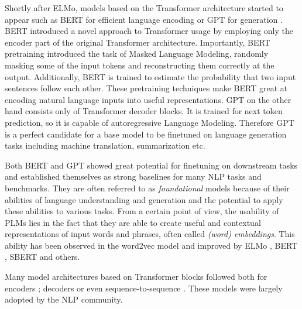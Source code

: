 Shortly after ELMo, models based on the Transformer architecture started to appear such as BERT for efficient language encoding \cite{devlin2019} or GPT for generation \cite{radford2018improving}.
BERT introduced a novel approach to Transformer usage by employing only the encoder part of the original Transformer architecture.
Importantly, BERT pretraining introduced the task of Masked Language Modeling, randomly masking some of the input tokens and reconstructing them correctly at the output.
Additionally, BERT is trained to estimate the probability that two input sentences follow each other.
These pretraining techniques make BERT great at encoding natural language inputs into useful representations.
GPT on the other hand consists only of Transformer decoder blocks.
It is trained for next token prediction, so it is capable of autoregressive Language Modeling.
Therefore GPT is a perfect candidate for a base model to be finetuned on language generation tasks including machine translation, summarization etc.


Both BERT and GPT showed great potential for finetuning on downstream tasks and established themselves as strong baselines for many NLP tasks and benchmarks.
They are often referred to as \emph{foundational} models because of their abilities of language understanding and generation and the potential to apply these abilities to various tasks.
From a certain point of view, the usability of PLMs lies in the fact that they are able to create useful and contextual representations of input words and phrases, often called \emph{(word) embeddings}.
This ability has been observed in the word2vec model \cite{mikolov2013distributed} and improved by ELMo \cite{peters-etal-2018-deep}, BERT \cite{devlin2019}, SBERT \cite{reimers2019sentence} and others.

Many model architectures based on Transformer blocks followed both for encoders \cite{liu2019roberta,reimers2019sentence}; decoders \cite{radford2019language,brown2020language} or even sequence-to-sequence \cite{raffel2020exploring,lewis-etal-2020-bart}.
These models were largely adopted by the NLP community.


